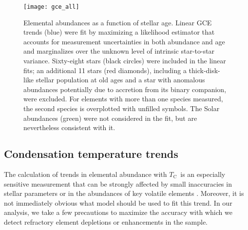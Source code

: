 \documentclass[twocolumn, trackchanges]{aastex62}
\newcommand{\tc}{$T_\mathrm{C}$}
\newcommand{\acronym}[1]{{\small{#1}}}
\begin{document}
\begin{figure*}
\centering
\texttt{[image: gce\_all]}
\caption{Elemental abundances as a function of stellar age. Linear \acronym{GCE} trends (blue) were fit by maximizing a likelihood estimator that accounts for measurement uncertainties in both abundance and age and marginalizes over the unknown level of intrinsic star-to-star variance. Sixty-eight stars (black circles) were included in the linear fits; an additional 11 stars (red diamonds), including a thick-disk-like stellar population at old ages and a star with anomalous abundances potentially due to accretion from its binary companion, were excluded. For elements with more than one species measured, the second species is overplotted with unfilled symbols. The Solar abundances (green) were not considered in the fit, but are nevertheless consistent with it.}
\label{fig:gce}
\end{figure*}

\subsection{Condensation temperature trends}
\label{s:tc}

The calculation of trends in elemental abundance with \tc\ is an especially sensitive measurement that can be strongly affected by small inaccuracies in stellar parameters or in the abundances of key volatile elements \citep[e.g.][]{teske16, adibekyan16}. 
Moreover, it is not immediately obvious what model should be used to fit this trend. 
In our analysis, we take a few precautions to maximize the accuracy with which we detect refractory element depletions or enhancements in the sample.
\end{document}
